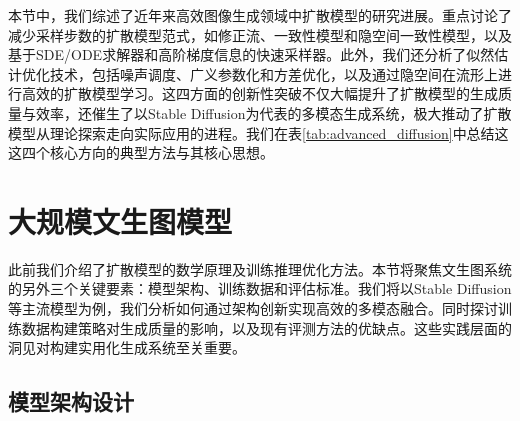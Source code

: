 \documentclass[11pt,a4paper,UTF8]{ctexart}
\begin{document}
本节中，我们综述了近年来高效图像生成领域中扩散模型的研究进展。重点讨论了减少采样步数的扩散模型范式，如修正流、一致性模型和隐空间一致性模型，以及基于SDE/ODE求解器和高阶梯度信息的快速采样器。此外，我们还分析了似然估计优化技术，包括噪声调度、广义参数化和方差优化，以及通过隐空间在流形上进行高效的扩散模型学习。这四方面的创新性突破不仅大幅提升了扩散模型的生成质量与效率，还催生了以Stable Diffusion\cite{rombach2022high}为代表的多模态生成系统，极大推动了扩散模型从理论探索走向实际应用的进程。我们在表\ref{tab:advanced_diffusion}中总结这这四个核心方向的典型方法与其核心思想。

\newpage

\section{大规模文生图模型}

此前我们介绍了扩散模型的数学原理及训练推理优化方法。本节将聚焦文生图系统的另外三个关键要素：模型架构、训练数据和评估标准。我们将以Stable Diffusion等主流模型为例，我们分析如何通过架构创新实现高效的多模态融合。同时探讨训练数据构建策略对生成质量的影响，以及现有评测方法的优缺点。这些实践层面的洞见对构建实用化生成系统至关重要。

\subsection{模型架构设计}
\label{sec:arch}
\end{document}
